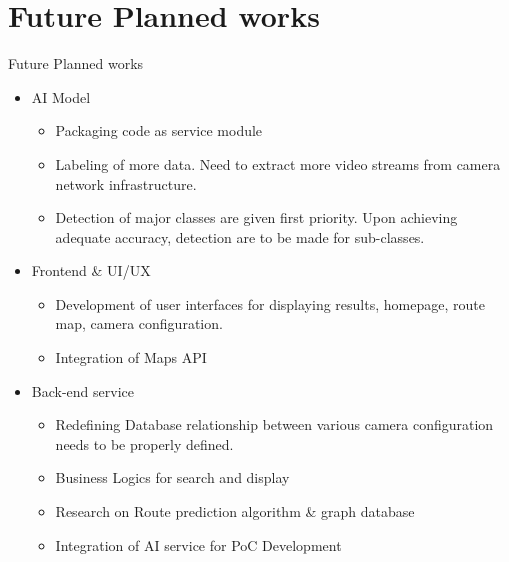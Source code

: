 \documentclass{beamer}
\begin{document}
	\section{Future Planned works}
	\begin{frame}[allowframebreaks]{Future Planned works}
		\begin{itemize}
			\item AI Model \\
			\begin{itemize}
				\item Packaging code as service module
				\item Labeling of more data. Need to extract more video streams from camera network infrastructure.
				\item Detection of major classes are given first priority. Upon achieving adequate accuracy, detection are to be made for sub-classes.
			\end{itemize}
			
			\item Frontend \& UI/UX\\
			\begin{itemize}
				\item Development of user interfaces for displaying results, homepage, route map, camera configuration.
				\item Integration of Maps API
			\end{itemize}
			\newpage
			\item Back-end service\\
			\begin{itemize}
				\item Redefining Database relationship between various camera configuration needs to be properly defined.
				\item Business Logics for search and display
				\item Research on Route prediction algorithm \& graph database
				\item Integration of AI service for PoC Development
			\end{itemize}
		\end{itemize}
	\end{frame}
\end{document}
